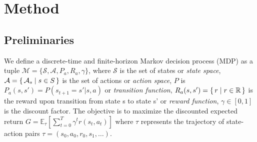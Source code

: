 \chapter{Method}
\label{Method}
\minitoc 

\section{Preliminaries}
We define a discrete-time and finite-horizon Markov decision process (MDP) as a 
tuple $\mathcal{M} = \{ \mathcal{S}, \mathcal{A}, P_{a}, R_{a}, \gamma \}$, 
where $\mathcal{S}$ is the set of states or \textit{state space}, 
$\mathcal{A}=\set{\mathcal{A}_s | s \in S}$ is the set of actions or \textit{action space}, 
$P$ is $P_a(s, s') = P(s_{t+1} = s' | s, a)$ or \textit{transition function}, 
$R_a(s, s') = \set{r | r \in \mathbb R}$ is the reward upon transition from state s to 
state s' or \textit{reward function}, 
$\gamma \in [ 0, 1 ]$ is the discount factor. 
The objective is to maximize the discounted expected return 
$G= \mathbb{E}_{\tau} [ \sum^T_{t=0} \gamma^t r(s_t, a_t) ]$ where $\tau$ represents 
the trajectory of state-action pairs $\tau = (s_0, a_0, r_0, s_1, \ldots)$.

